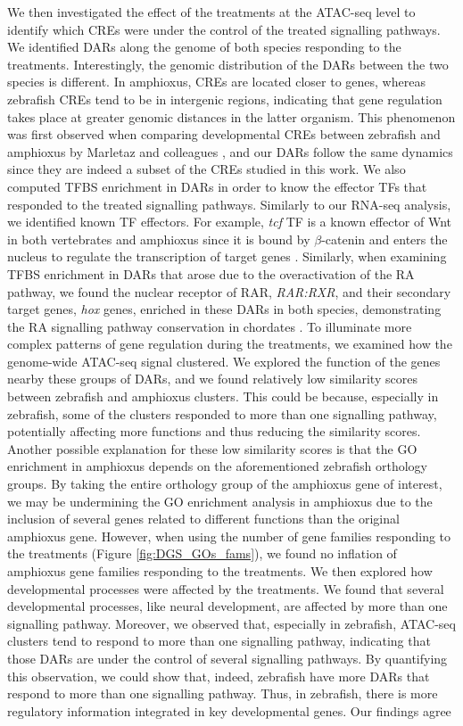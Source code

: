 We then investigated the effect of the treatments at the ATAC-seq level to identify which CREs were under the control of the treated signalling pathways. We identified DARs along the genome of both species responding to the treatments. Interestingly, the genomic distribution of the DARs between the two species is different. In amphioxus, CREs are located closer to genes, whereas zebrafish CREs tend to be in intergenic regions, indicating that gene regulation takes place at greater genomic distances in the latter organism. This phenomenon was first observed when comparing developmental CREs between zebrafish and amphioxus by Marletaz and colleagues \parencite{marletaz_amphioxus_2018}, and our DARs follow the same dynamics since they are indeed a subset of the CREs studied in this work. We also computed TFBS enrichment in DARs in order to know the effector TFs that responded to the treated signalling pathways. Similarly to our RNA-seq analysis, we identified known TF effectors. For example, \textit{tcf} TF is a known effector of Wnt in both vertebrates and amphioxus since it is bound by $\beta$-catenin and enters the nucleus to regulate the transcription of target genes \parencite{bertrand_developmental_2017, steinhart_wnt_2018}. Similarly, when examining TFBS enrichment in DARs that arose due to the overactivation of the RA pathway, we found the nuclear receptor of RAR, \textit{RAR:RXR}, and their secondary target genes, \textit{hox} genes, enriched in these DARs in both species, demonstrating the RA signalling pathway conservation in chordates \parencite{ghyselinck_retinoic_2019}. To illuminate more complex patterns of gene regulation during the treatments, we examined how the genome-wide ATAC-seq signal clustered. We explored the function of the genes nearby these groups of DARs, and we found relatively low similarity scores between zebrafish and amphioxus clusters. This could be because, especially in zebrafish, some of the clusters responded to more than one signalling pathway, potentially affecting more functions and thus reducing the similarity scores. Another possible explanation for these low similarity scores is that the GO enrichment in amphioxus depends on the aforementioned zebrafish orthology groups. By taking the entire orthology group of the amphioxus gene of interest, we may be undermining the GO enrichment analysis in amphioxus due to the inclusion of several genes related to different functions than the original amphioxus gene. However, when using the number of gene families responding to the treatments (Figure \ref{fig:DGS_GOs_fams}), we found no inflation of amphioxus gene families responding to the treatments. We then explored how developmental processes were affected by the treatments. We found that several developmental processes, like neural development, are affected by more than one signalling pathway. Moreover, we observed that, especially in zebrafish, ATAC-seq clusters tend to respond to more than one signalling pathway, indicating that those DARs are under the control of several signalling pathways. By quantifying this observation, we could show that, indeed, zebrafish have more DARs that respond to more than one signalling pathway. Thus, in zebrafish, there is more regulatory information integrated in key developmental genes. Our findings agree 